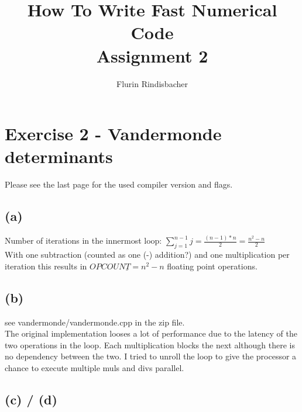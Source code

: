 \documentclass[10pt,a4paper,oneside,notitlepage]{report}
\author{Flurin Rindisbacher}
\title{How To Write Fast Numerical Code \\ \vspace{6 mm} \textbf{Assignment 2}}
\begin{document}
\maketitle

\section*{Exercise 2 - Vandermonde determinants}

Please see the last page for the used compiler version and flags.

\subsection*{(a)}
Number of iterations in the innermost loop: $\sum\limits_{j=1}^{n-1} j = \frac{(n-1)*n}{2} = \frac{n^2 -n}{2}$ \\
With one subtraction (counted as one (-) addition?) and one multiplication per iteration this results in $\underline{OPCOUNT = n^2-n}$ floating point operations.  

\subsection*{(b)}
see vandermonde/vandermonde.cpp in the zip file. \\
The original implementation looses a lot of performance due to the latency of the two operations in the loop. Each multiplication blocks the next although there is no dependency between the two. I tried to unroll the loop to give the processor a chance to execute multiple muls and divs parallel.

\subsection*{(c) / (d)}	
\end{document}
